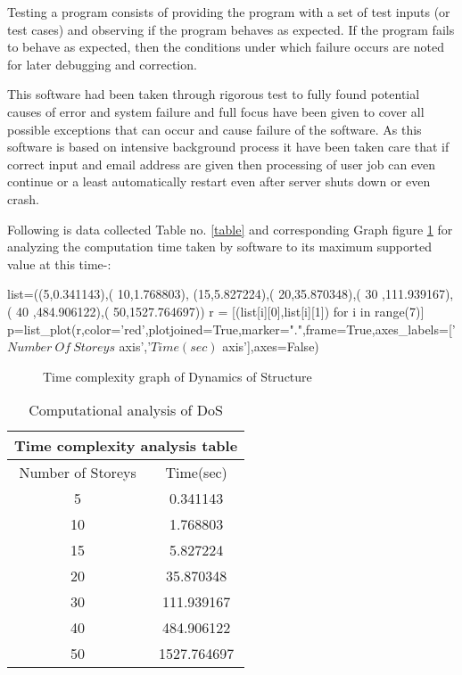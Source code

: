 Testing a program consists of providing the program with a set of test inputs (or test cases) and
observing if the program behaves as expected. If the program fails to behave as expected, then the
conditions under which failure occurs are noted for later debugging and correction. 


This software had been taken through rigorous test to fully found potential causes of error and system failure
and full focus have been given to cover all possible exceptions that can 
occur and cause failure of the software.
As this software is based on intensive background process it have been taken care that 
if correct input and email address are given then processing of user job can even continue or a least automatically 
restart even after server shuts down or even crash.

Following is data collected Table no. \ref{table} and corresponding Graph figure \ref{fig:graph} for analyzing the computation time taken by software 
to its maximum supported value at this time-:
\begin{sagesilent}
list=((5,0.341143),(
10,1.768803),
(15,5.827224),(
20,35.870348),(
30 ,111.939167),(
40 ,484.906122),(
50,1527.764697))
r = [(list[i][0],list[i][1]) for i in range(7)]
p=list_plot(r,color='red',plotjoined=True,marker=".",frame=True,axes_labels=['$Number \ Of \ Storeys$ axis','$Time(sec)$ axis'],axes=False)
\end{sagesilent}

\begin{figure}[H]
	\caption{Time complexity graph of Dynamics of Structure}
	\label{fig:graph}
\end{figure}



\begin{table}[h]
\centering
\begin{tabular}{ ||c|c|| }
\hline
 \multicolumn{2}{||c||}{Time complexity analysis table} \\
 \hline
 Number of Storeys & Time(sec) \\ [0.5ex] 
 \hline \hline
	5 & 0.341143 \\ \hline
	10 & 1.768803 \\ \hline
	15 & 5.827224 \\ \hline
	20 & 35.870348 \\ \hline
	30 & 111.939167 \\ \hline
	40 & 484.906122 \\ \hline
	50 & 1527.764697 \\ [1ex]
 \hline
\end{tabular}
\caption{Computational analysis of DoS}
\label{table2}
\end{table}

